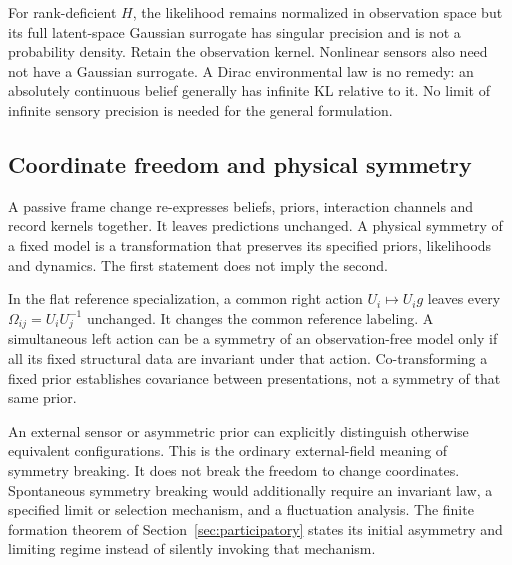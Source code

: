 For rank-deficient $H$, the likelihood remains normalized in observation space but its full latent-space Gaussian surrogate has singular precision and is not a probability density. Retain the observation kernel. Nonlinear sensors also need not have a Gaussian surrogate. A Dirac environmental law is no remedy: an absolutely continuous belief generally has infinite KL relative to it. No limit of infinite sensory precision is needed for the general formulation.

\subsection{Coordinate freedom and physical symmetry}\label{sec:symmetry_breaking}
A passive frame change re-expresses beliefs, priors, interaction channels and record kernels together. It leaves predictions unchanged. A physical symmetry of a fixed model is a transformation that preserves its specified priors, likelihoods and dynamics. The first statement does not imply the second.

In the flat reference specialization, a common right action $U_i\mapsto U_ig$ leaves every $\Omega_{ij}=U_iU_j^{-1}$ unchanged. It changes the common reference labeling. A simultaneous left action can be a symmetry of an observation-free model only if all its fixed structural data are invariant under that action. Co-transforming a fixed prior establishes covariance between presentations, not a symmetry of that same prior.

An external sensor or asymmetric prior can explicitly distinguish otherwise equivalent configurations. This is the ordinary external-field meaning of symmetry breaking. It does not break the freedom to change coordinates. Spontaneous symmetry breaking would additionally require an invariant law, a specified limit or selection mechanism, and a fluctuation analysis. The finite formation theorem of Section~\ref{sec:participatory} states its initial asymmetry and limiting regime instead of silently invoking that mechanism.
